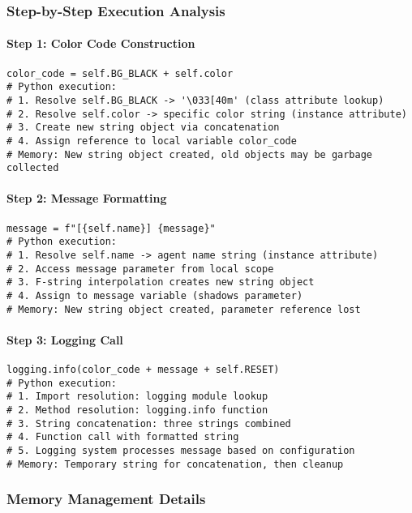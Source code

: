 \subsubsection{Step-by-Step Execution Analysis}

\paragraph{Step 1: Color Code Construction}
\begin{lstlisting}[caption=Color Code Memory Analysis]
color_code = self.BG_BLACK + self.color
# Python execution:
# 1. Resolve self.BG_BLACK -> '\033[40m' (class attribute lookup)
# 2. Resolve self.color -> specific color string (instance attribute)
# 3. Create new string object via concatenation
# 4. Assign reference to local variable color_code
# Memory: New string object created, old objects may be garbage collected
\end{lstlisting}

\paragraph{Step 2: Message Formatting}
\begin{lstlisting}[caption=F-String Processing Analysis]
message = f"[{self.name}] {message}"
# Python execution:
# 1. Resolve self.name -> agent name string (instance attribute)
# 2. Access message parameter from local scope
# 3. F-string interpolation creates new string object
# 4. Assign to message variable (shadows parameter)
# Memory: New string object created, parameter reference lost
\end{lstlisting}

\paragraph{Step 3: Logging Call}
\begin{lstlisting}[caption=Logging System Integration]
logging.info(color_code + message + self.RESET)
# Python execution:
# 1. Import resolution: logging module lookup
# 2. Method resolution: logging.info function
# 3. String concatenation: three strings combined
# 4. Function call with formatted string
# 5. Logging system processes message based on configuration
# Memory: Temporary string for concatenation, then cleanup
\end{lstlisting}

\subsubsection{Memory Management Details}

